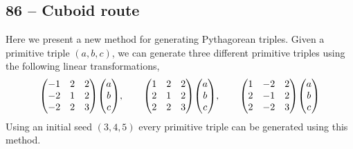 \documentclass{article}
\begin{document}
\subsection*{86 -- Cuboid route} 
Here we present a new method for generating Pythagorean triples.
Given a primitive triple $(a, b, c)$, we can generate three different primitive triples using the following linear transformations,
\begin{align*}
	\mqty( -1 & 2 & 2 \\ -2 & 1 & 2 \\ -2 & 2 & 3 ) \mqty( a \\ b \\ c ), \qquad
	\mqty( 1 & 2 & 2 \\ 2 & 1 & 2 \\ 2 & 2 & 3 ) \mqty( a \\ b \\ c ), \qquad
	\mqty( 1 & -2 & 2 \\ 2 & -1 & 2 \\ 2 & -2 & 3 ) \mqty( a \\ b \\ c )
\end{align*}
Using an initial seed $(3, 4, 5)$ every primitive triple can be generated using this method.
\end{document}
